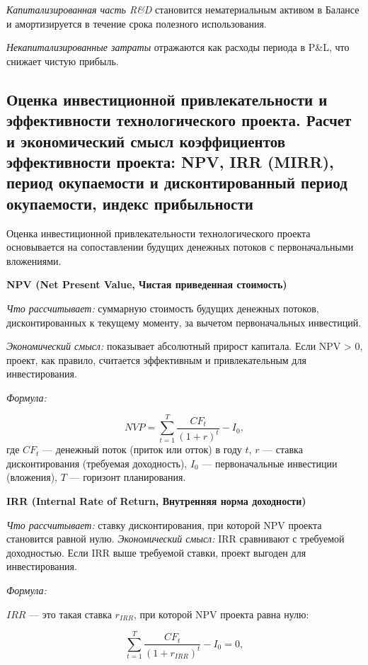 \textit{Капитализированная часть R\&D} становится нематериальным активом в Балансе и амортизируется в течение срока полезного использования.

\textit{Некапитализированные затраты} отражаются как расходы периода в P\&L, что снижает чистую прибыль.


\pagebreak
\subsection{Оценка инвестиционной привлекательности и эффективности технологического проекта. Расчет и экономический смысл коэффициентов эффективности проекта: NPV, IRR (MIRR), период окупаемости и дисконтированный период окупаемости, индекс прибыльности}

Оценка инвестиционной привлекательности технологического проекта основывается на сопоставлении будущих денежных потоков с первоначальными вложениями. 

\textbf{NPV (Net Present Value, Чистая приведенная стоимость)}

\textit{Что рассчитывает:} суммарную стоимость будущих денежных потоков, дисконтированных к текущему моменту, за вычетом первоначальных инвестиций.

\textit{Экономический смысл:} показывает абсолютный прирост капитала. Если NPV > 0, проект, как правило, считается эффективным и привлекательным для инвестирования.

\textit{Формула:}

\begin{equation}
    NVP = \sum \limits_{t=1} ^T \frac{CF_t}{(1+r)^t} - I_0,
\end{equation}
\noindent где $CF_t$ --- денежный поток (приток или отток) в году $t$, $r$ --- ставка дисконтирования (требуемая доходность), $I_0$ --- первоначальные инвестиции (вложения), $T$ --- горизонт планирования.


\textbf{IRR (Internal Rate of Return, Внутренняя норма доходности)}

\textit{Что рассчитывает:} ставку дисконтирования, при которой NPV проекта становится равной нулю. 
\textit{Экономический смысл:} IRR сравнивают с требуемой доходностью. Если IRR выше требуемой ставки, проект выгоден для инвестирования.


\textit{Формула:}

$IRR$ --- это такая ставка $r_{IRR}$, при которой NPV проекта равна нулю:

\begin{equation}
    \sum \limits_{t=1} ^T \frac{CF_t}{(1+r_{IRR})^t} - I_0 = 0,
\end{equation}

